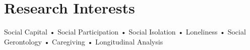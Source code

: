 \section{Research Interests}

\begin{aka}

    \item [] Social Capital • Social Participation • Social Isolation • Loneliness • Social Gerontology • Caregiving • Longitudinal Analysis
\end{aka}
